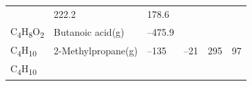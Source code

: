 \documentclass[
  9pt,
]{extbook}
\theoremstyle{definition}
\theoremstyle{definition}
\theoremstyle{definition}
\theoremstyle{remark}
\begin{document}
\begin{longtable}[]{@{}llllll@{}}
\begin{minipage}[t]{0.15\columnwidth}
\strut
\end{minipage} & \begin{minipage}[t]{0.14\columnwidth}\raggedright
222.2\strut
\end{minipage} & \begin{minipage}[t]{0.14\columnwidth}\raggedright
178.6\strut
\end{minipage}\tabularnewline
\begin{minipage}[t]{0.07\columnwidth}\raggedright
C\textsubscript{4}H\textsubscript{8}O\textsubscript{2}\strut
\end{minipage} & \begin{minipage}[t]{0.17\columnwidth}\raggedright
Butanoic acid(g)\strut
\end{minipage} & \begin{minipage}[t]{0.15\columnwidth}\raggedright
--475.9\strut
\end{minipage} & \begin{minipage}[t]{0.15\columnwidth}\raggedright
\strut
\end{minipage} & \begin{minipage}[t]{0.14\columnwidth}\raggedright
\strut
\end{minipage} & \begin{minipage}[t]{0.14\columnwidth}\raggedright
\strut
\end{minipage}\tabularnewline
\begin{minipage}[t]{0.07\columnwidth}\raggedright
C\textsubscript{4}H\textsubscript{10}\strut
\end{minipage} & \begin{minipage}[t]{0.17\columnwidth}\raggedright
2-Methylpropane(g)\strut
\end{minipage} & \begin{minipage}[t]{0.15\columnwidth}\raggedright
--135\strut
\end{minipage} & \begin{minipage}[t]{0.15\columnwidth}\raggedright
--21\strut
\end{minipage} & \begin{minipage}[t]{0.14\columnwidth}\raggedright
295\strut
\end{minipage} & \begin{minipage}[t]{0.14\columnwidth}\raggedright
97\strut
\end{minipage}\tabularnewline
\begin{minipage}[t]{0.07\columnwidth}\raggedright
C\textsubscript{4}H\textsubscript{10}\strut
\end{minipage} & \begin{minipage}[t]{0.17\columnwidth}\raggedright

\end{minipage}
\end{longtable}
\end{document}
